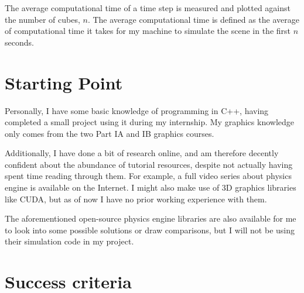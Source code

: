 \documentclass[12pt]{article}
\begin{document}
\begin{center}
\end{center}

The average computational time of a time step is measured and plotted against the number of cubes, $n$.
The average computational time is defined as the average of computational time 
it takes for my machine to simulate the scene in the first $n$ seconds.

\section{Starting Point}

Personally, I have some basic knowledge of programming in C++, having completed a small project using it during my internship.
My graphics knowledge only comes from the two Part IA and IB graphics courses.

Additionally, I have done a bit of research online, 
and am therefore decently confident about the abundance of tutorial resources, 
despite not actually having spent time reading through them.
For example, a full video series about physics engine is available on the Internet\cite{tutorialyt}.
I might also make use of 3D graphics libraries like CUDA\cite{cuda}, but as of now I have no prior working experience with them.

The aforementioned open-source physics engine libraries are also available for me to look into some possible solutions or draw comparisons, 
but I will not be using their simulation code in my project.

\section{Success criteria}
\end{document}
